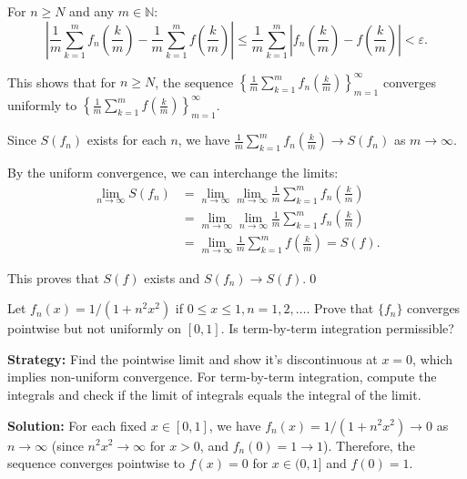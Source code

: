 For \( n \geq N \) and any \( m \in \mathbb{N} \):
\[\left|\frac{1}{m} \sum_{k=1}^m f_n \left( \frac{k}{m} \right) - \frac{1}{m} \sum_{k=1}^m f \left( \frac{k}{m} \right)\right| \leq \frac{1}{m} \sum_{k=1}^m \left|f_n \left( \frac{k}{m} \right) - f \left( \frac{k}{m} \right)\right| < \varepsilon.\]

This shows that for \( n \geq N \), the sequence \( \left\{\frac{1}{m} \sum_{k=1}^m f_n \left( \frac{k}{m} \right)\right\}_{m=1}^{\infty} \) converges uniformly to \( \left\{\frac{1}{m} \sum_{k=1}^m f \left( \frac{k}{m} \right)\right\}_{m=1}^{\infty} \).

Since \( S(f_n) \) exists for each \( n \), we have \( \frac{1}{m} \sum_{k=1}^m f_n \left( \frac{k}{m} \right) \to S(f_n) \) as \( m \to \infty \).

By the uniform convergence, we can interchange the limits:
\begin{align*}
\lim_{n \to \infty} S(f_n) &= \lim_{n \to \infty} \lim_{m \to \infty} \frac{1}{m} \sum_{k=1}^m f_n \left( \frac{k}{m} \right) \\
&= \lim_{m \to \infty} \lim_{n \to \infty} \frac{1}{m} \sum_{k=1}^m f_n \left( \frac{k}{m} \right) \\
&= \lim_{m \to \infty} \frac{1}{m} \sum_{k=1}^m f \left( \frac{k}{m} \right) = S(f).
\end{align*}

This proves that \( S(f) \) exists and \( S(f_n) \to S(f) \).\qed


\begin{problembox}
\begin{problemstatement}
Let \( f_n(x) = 1/(1 + n^2x^2) \) if \( 0 \leq x \leq 1, n = 1, 2, \ldots \). Prove that \(\{f_n\}\) converges pointwise but not uniformly on \([0, 1]\). Is term-by-term integration permissible?
\end{problemstatement}
\end{problembox}

\noindent\textbf{Strategy:} Find the pointwise limit and show it's discontinuous at \( x = 0 \), which implies non-uniform convergence. For term-by-term integration, compute the integrals and check if the limit of integrals equals the integral of the limit.

\bigskip\noindent\textbf{Solution:} For each fixed \( x \in [0, 1] \), we have \( f_n(x) = 1/(1 + n^2x^2) \to 0 \) as \( n \to \infty \) (since \( n^2x^2 \to \infty \) for \( x > 0 \), and \( f_n(0) = 1 \to 1 \)). Therefore, the sequence converges pointwise to \( f(x) = 0 \) for \( x \in (0, 1] \) and \( f(0) = 1 \).

